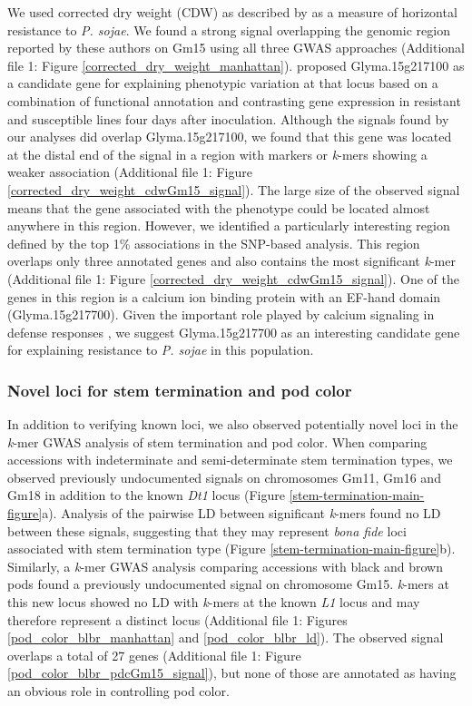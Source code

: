 We used corrected dry weight (CDW) as described by \cite{deronne2022} as a
measure of horizontal resistance to \emph{P. sojae}. We found a strong signal
overlapping the genomic region reported by these authors on Gm15 using all three GWAS
approaches (Additional file 1: Figure \ref{corrected_dry_weight_manhattan}). \cite{deronne2022}
proposed Glyma.15g217100 as a candidate gene for explaining phenotypic
variation at that locus based on a combination of functional annotation and
contrasting gene expression in resistant and susceptible lines four days after
inoculation. Although the signals found by our analyses did overlap
Glyma.15g217100, we found that this gene was located at the distal end of the signal
in a region with markers or \emph{k}-mers showing a weaker
association (Additional file 1: Figure \ref{corrected_dry_weight_cdwGm15_signal}). The
large size of the observed signal means that the gene associated with the phenotype could
be located almost anywhere in this region. However, we identified a particularly
interesting region defined by the top 1\% associations in the SNP-based
analysis. This region overlaps only three annotated genes and also contains the
most significant \emph{k}-mer (Additional file 1: Figure
\ref{corrected_dry_weight_cdwGm15_signal}). One of the genes in this region is
a calcium ion binding protein with an EF-hand domain (Glyma.15g217700).
Given the important role played by calcium signaling in defense
responses \citep{zhang2014}, we suggest Glyma.15g217700 as an interesting
candidate gene for explaining resistance to \emph{P. sojae} in this population.

\subsubsection*{Novel loci for stem termination and pod color}
\label{sv-gwas-main-results-novel-loci}

In addition to verifying known loci, we also observed potentially novel loci in
the \textit{k}-mer GWAS analysis of stem termination and pod color.  When
comparing accessions with indeterminate and semi-determinate stem termination
types, we observed previously undocumented signals on chromosomes Gm11, Gm16
and Gm18 in addition to the known \textit{Dt1} locus (Figure
\ref{stem-termination-main-figure}a).  Analysis of the pairwise LD between
significant \textit{k}-mers found no LD between these signals, suggesting that
they may represent \textit{bona fide} loci associated with stem termination
type (Figure \ref{stem-termination-main-figure}b). Similarly, a \textit{k}-mer
GWAS analysis comparing accessions with black and brown pods found a previously
undocumented signal on chromosome Gm15. \textit{k}-mers at this new locus
showed no LD with \textit{k}-mers at the known \textit{L1} locus and may
therefore represent a distinct locus (Additional file 1: Figures \ref{pod_color_blbr_manhattan} and
\ref{pod_color_blbr_ld}). The observed signal overlaps a total of 27 genes
(Additional file 1: Figure \ref{pod_color_blbr_pdcGm15_signal}), but none of those are annotated
as having an obvious role in controlling pod color.

